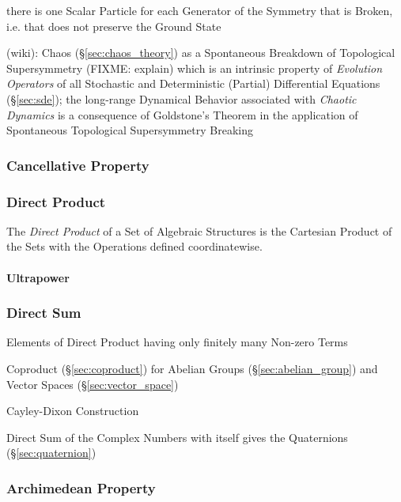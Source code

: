 there is one Scalar Particle for each Generator of the Symmetry that is Broken,
i.e. that does not preserve the Ground State

(wiki): Chaos (\S\ref{sec:chaos_theory}) as a Spontaneous Breakdown of
Topological Supersymmetry (FIXME: explain) which is an intrinsic property of
\emph{Evolution Operators} of all Stochastic and Deterministic (Partial)
Differential Equations (\S\ref{sec:sde}); the long-range Dynamical Behavior
associated with \emph{Chaotic Dynamics} is a consequence of Goldstone's Theorem
in the application of Spontaneous Topological Supersymmetry Breaking



\subsubsection{Cancellative Property}\label{sec:cancellative_property}

\subsubsection{Direct Product}\label{sec:direct_product}

The \emph{Direct Product} of a Set of Algebraic Structures is the
Cartesian Product of the Sets with the Operations defined
coordinatewise.



\paragraph{Ultrapower}\label{sec:ultrapower}\hfill



\subsubsection{Direct Sum}\label{sec:direct_sum}

Elements of Direct Product having only finitely many Non-zero Terms

Coproduct (\S\ref{sec:coproduct}) for Abelian Groups
(\S\ref{sec:abelian_group}) and Vector Spaces
(\S\ref{sec:vector_space})

Cayley-Dixon Construction

Direct Sum of the Complex Numbers with itself gives the Quaternions
(\S\ref{sec:quaternion})



\subsubsection{Archimedean Property}\label{sec:archimedean_property}

